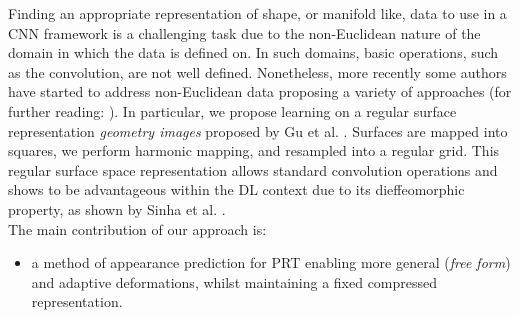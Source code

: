 Finding an appropriate representation of shape, or manifold like, data to use in a CNN framework is a challenging task due to the non-Euclidean nature of the domain in which the data is defined on. In such domains, basic operations, such as the convolution, are not well defined. Nonetheless, more recently some authors have started to address non-Euclidean data proposing a variety of approaches \cite{ShapeNet1, Geometric_deep_learning, CNN_on_Torus} (for further reading: \cite{GeoDeepLearning}).
In particular, we propose learning on a regular surface representation \textit{geometry images} proposed by Gu et al. . Surfaces are mapped into squares, we perform harmonic mapping, and resampled into a regular grid. This regular surface space representation allows standard convolution operations and shows to be advantageous within the DL context due to its dieffeomorphic property, as shown by Sinha et al. . 
\\
The main contribution of our approach is: 
\begin{itemize}
\item a method of appearance prediction for PRT enabling more general (\textit{free form}) and adaptive deformations, whilst maintaining a fixed compressed representation.
\end{itemize}

